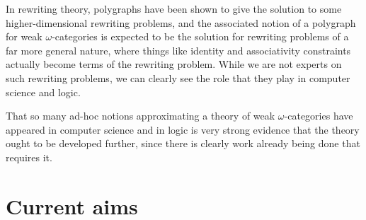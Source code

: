 \documentclass[a4paper,9pt]{amsart}
\theoremstyle{plain}   %
\theoremstyle{remark}
\theoremstyle{plain}
\begin{document}
In rewriting theory, polygraphs have been shown to give the solution to some higher-dimensional rewriting problems, and the associated notion of a polygraph for weak \(\omega\)-categories is expected to be the solution for rewriting problems of a far more general nature, where things like identity and associativity constraints actually become terms of the rewriting problem.  While we are not experts on such rewriting problems, we can clearly see the role that they play in computer science and logic. 

That so many ad-hoc notions approximating a theory of weak \(\omega\)-categories have appeared in computer science and in logic is very strong evidence that the theory ought to be developed further, since there is clearly work already being done that requires it.  


\section{Current aims}
\end{document}
